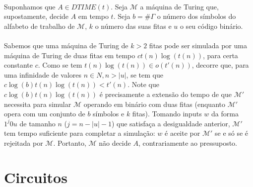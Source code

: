 \documentclass[10pt,a4paper]{report}
\begin{document}
\\
Suponhamos que $A \in DTIME(t)$. Seja $\mathcal{M}$ a máquina de Turing que, supostamente, decide $A$ em tempo $t$. Seja $b = \#\Gamma$ o número dos símbolos do alfabeto de trabalho de
$\mathcal{M}$, $k$ o número das suas fitas e $u$ o seu código binário.\\
\\
Sabemos que uma máquina de Turing de $k > 2$ fitas pode ser simulada por uma máquina de Turing de duas fitas em tempo $ct(n) \log(t(n))$, para certa constante $c$. Como se tem $t(n) \log (t(n)) \in o(t'(n))$, decorre que, para uma infinidade de valores $n \in N, n > |u|$, se tem que $c \log(b)t(n) \log(t(n)) < t'(n)$. Note que $c \log(b)t(n) \log(t(n))$ é precisamente a extensão do tempo de que $\mathcal{M'}$ necessita para simular $\mathcal{M}$ operando em binário com duas fitas (enquanto $\mathcal{M'}$ opera com um conjunto de $b$ símbolos e $k$ fitas). Tomando inputs $w$ da forma $1^j0u$ de tamanho $n$ ($j = n - |u| - 1$) que satisfaça a desigualdade anterior, $\mathcal{M'}$ tem tempo suficiente para completar a simulação: $w$ é aceite por $\mathcal{M'}$ se e só se é rejeitada por $\mathcal{M}$. Portanto, $\mathcal{M}$ não decide $A$, contrariamente ao pressuposto.

\section{Circuitos}
\end{document}
